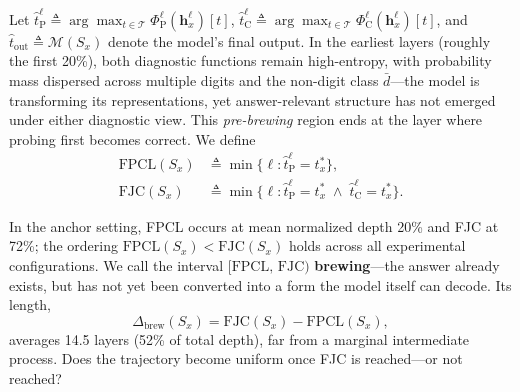 Let $\hat{t}_{\mathrm{P}}^\ell \triangleq \arg\max_{t \in \mathcal{T}} \Phi_{\mathrm{P}}^\ell(\mathbf{h}_x^\ell)[t]$, $\hat{t}_{\mathrm{C}}^\ell \triangleq \arg\max_{t \in \mathcal{T}} \Phi_{\mathrm{C}}^\ell(\mathbf{h}_x^\ell)[t]$, and $\hat{t}_{\mathrm{out}} \triangleq \mathcal{M}(S_x)$ denote the model's final output. In the earliest layers (roughly the first 20\%), both diagnostic functions remain high-entropy, with probability mass dispersed across multiple digits and the non-digit class $\bar{d}$---the model is transforming its representations, yet answer-relevant structure has not emerged under either diagnostic view. This \emph{pre-brewing} region ends at the layer where probing first becomes correct. We define
%
\begin{align}
\label{eq:fpcl}
\mathrm{FPCL}(S_x) &\triangleq \min\{\ell : \hat{t}_{\mathrm{P}}^\ell = t_x^*\}, \\
\label{eq:fjc}
\mathrm{FJC}(S_x) &\triangleq \min\{\ell : \hat{t}_{\mathrm{P}}^\ell = t_x^* \;\land\; \hat{t}_{\mathrm{C}}^\ell = t_x^*\}.
\end{align}

In the anchor setting, FPCL occurs at mean normalized depth 20\% and FJC at 72\%; the ordering $\mathrm{FPCL}(S_x) < \mathrm{FJC}(S_x)$ holds across all experimental configurations. We call the interval $[\mathrm{FPCL},\,\mathrm{FJC})$ \textbf{brewing}---the answer already exists, but has not yet been converted into a form the model itself can decode. Its length,
%
\begin{equation}
\label{eq:brewing_duration}
\Delta_{\mathrm{brew}}(S_x) = \mathrm{FJC}(S_x) - \mathrm{FPCL}(S_x),
\end{equation}
%
averages 14.5 layers (52\% of total depth), far from a marginal intermediate process. Does the trajectory become uniform once FJC is reached---or not reached?

